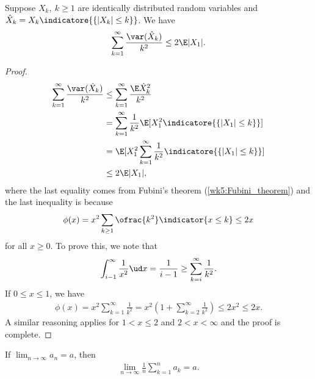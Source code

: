 \documentclass[../aipt.tex]{subfiles}
\begin{document}
\begin{Lemma} \label{wk7:lemma:var_mean_ineq}
Suppose $X_k,\ k \geq 1$ are identically distributed random variables and $\hat{X}_k = X_k \indicatore{\{|X_k| \leq k\}}$. We have
\begin{align*}
\sum_{k=1}^{\infty} \frac{\var(\hat{X}_k)}{k^2} \leq 2 \E |X_1|.
\end{align*}
\end{Lemma}
%
\begin{proof}
\begin{align*}
\sum_{k=1}^{\infty} \frac{\var(\hat{X}_k)}{k^2} 
&\leq \sum_{k=1}^{\infty} \frac{\E \hat{X}_k^2}{k^2} \\
&= \sum_{k=1}^{\infty} \frac{1}{k^2} \E[X_1^2 \indicatore{\{|X_1| \leq k\}}] \\
&= \E[X_1^2 \sum_{k=1}^{\infty} \frac{1}{k^2} \indicatore{\{|X_1| \leq k\}}] \\
&\leq 2 \E |X_1|,
\end{align*}
where the last equality comes from Fubini's theorem (\cref{wk5:Fubini_theorem}) and the last inequality is because 
\begin{align*}
\phi(x) = x^2\sum_{k\geq1} \ofrac{k^2} \indicator{x\leq k} \leq 2x
\end{align*}
for all $x\geq0$. To prove this, we note that
\begin{align*}
\int_{i-1}^{\infty} \frac{1}{x^2} \ud x = \frac{1}{i-1} \geq \sum_{k = i}^{\infty} \frac{1}{k^2}.
\end{align*}
If $0 \leq x \leq 1$, we have
\begin{align*}
\phi(x) = x^2 \sum_{k = 1}^{\infty} \frac{1}{k^2} 
= x^2 \left(1 + \sum_{k = 2}^{\infty} \frac{1}{k^2} \right)
\leq 2 x^2 \leq 2x.
\end{align*}
A similar reasoning applies for $1 < x \leq 2$ and $2 < x < \infty$ and the proof is complete.
\end{proof}
%
\begin{Lemma} \label{wk7:lemma:Cesaro}
If $\lim_{n \to \infty} a_n = a$, then 
\begin{align*}
\lim_{n \to \infty} \frac{1}{n} \sum_{k = 1}^{n} a_k = a.
\end{align*}
\end{Lemma}
\end{document}
